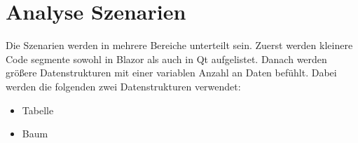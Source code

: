 \section{Analyse Szenarien}
Die Szenarien werden in mehrere
Bereiche unterteilt sein. Zuerst werden kleinere Code segmente sowohl in Blazor als
auch in Qt aufgelistet. Danach werden größere Datenstrukturen mit einer variablen Anzahl an Daten
befühlt. Dabei werden die folgenden zwei Datenstrukturen verwendet:

\begin{itemize}
    \item Tabelle
    \item Baum
\end{itemize}




